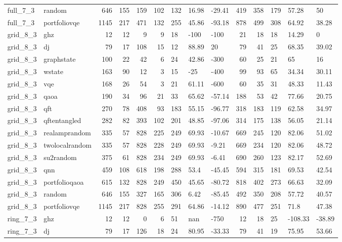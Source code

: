 \begin{longtable}{llrrrrlllrrlll}
full\_7\_3 & random & 646 & 155 & 159 & 102 & 132 & 16.98 & -29.41 & 419 & 358 & 179 & 57.28 & 50 \\
full\_7\_3 & portfoliovqe & 1145 & 217 & 471 & 132 & 255 & 45.86 & -93.18 & 878 & 499 & 308 & 64.92 & 38.28 \\
grid\_8\_3 & ghz & 12 & 12 & 9 & 9 & 18 & -100 & -100 & 21 & 18 & 18 & 14.29 & 0 \\
grid\_8\_3 & dj & 79 & 17 & 108 & 15 & 12 & 88.89 & 20 & 79 & 41 & 25 & 68.35 & 39.02 \\
grid\_8\_3 & graphstate & 100 & 22 & 42 & 6 & 24 & 42.86 & -300 & 60 & 25 & 21 & 65 & 16 \\
grid\_8\_3 & wstate & 163 & 90 & 12 & 3 & 15 & -25 & -400 & 99 & 93 & 65 & 34.34 & 30.11 \\
grid\_8\_3 & vqe & 168 & 26 & 54 & 3 & 21 & 61.11 & -600 & 60 & 35 & 31 & 48.33 & 11.43 \\
grid\_8\_3 & qaoa & 190 & 34 & 96 & 21 & 33 & 65.62 & -57.14 & 188 & 53 & 42 & 77.66 & 20.75 \\
grid\_8\_3 & qft & 270 & 78 & 408 & 93 & 183 & 55.15 & -96.77 & 318 & 183 & 119 & 62.58 & 34.97 \\
grid\_8\_3 & qftentangled & 282 & 82 & 393 & 102 & 201 & 48.85 & -97.06 & 314 & 175 & 138 & 56.05 & 21.14 \\
grid\_8\_3 & realamprandom & 335 & 57 & 828 & 225 & 249 & 69.93 & -10.67 & 669 & 245 & 120 & 82.06 & 51.02 \\
grid\_8\_3 & twolocalrandom & 335 & 57 & 828 & 228 & 249 & 69.93 & -9.21 & 669 & 234 & 120 & 82.06 & 48.72 \\
grid\_8\_3 & su2random & 375 & 61 & 828 & 234 & 249 & 69.93 & -6.41 & 690 & 260 & 123 & 82.17 & 52.69 \\
grid\_8\_3 & qnn & 459 & 108 & 618 & 198 & 288 & 53.4 & -45.45 & 594 & 315 & 181 & 69.53 & 42.54 \\
grid\_8\_3 & portfolioqaoa & 615 & 132 & 828 & 249 & 450 & 45.65 & -80.72 & 818 & 402 & 273 & 66.63 & 32.09 \\
grid\_8\_3 & random & 646 & 155 & 327 & 165 & 306 & 6.42 & -85.45 & 492 & 350 & 208 & 57.72 & 40.57 \\
grid\_8\_3 & portfoliovqe & 1145 & 217 & 828 & 255 & 291 & 64.86 & -14.12 & 890 & 477 & 251 & 71.8 & 47.38 \\
ring\_7\_3 & ghz & 12 & 12 & 0 & 6 & 51 & nan & -750 & 12 & 18 & 25 & -108.33 & -38.89 \\
ring\_7\_3 & dj & 79 & 17 & 126 & 18 & 24 & 80.95 & -33.33 & 79 & 41 & 19 & 75.95 & 53.66 \\

\end{longtable}
